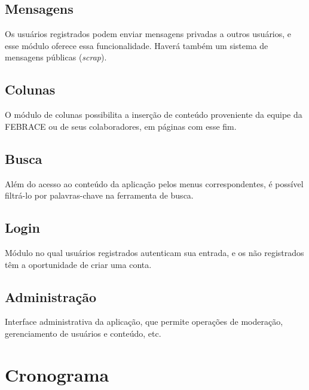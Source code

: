\documentclass[a4paper,12pt,font=plain,header=plain]{abnt}
\begin{document}
		\section{Mensagens}
		Os usuários registrados podem enviar mensagens privadas a outros usuários, e esse módulo oferece essa funcionalidade. Haverá também um sistema de mensagens públicas (\textit{scrap}).
	
		\section{Colunas}
		O módulo de colunas possibilita a inserção de conteúdo proveniente da equipe da FEBRACE ou de seus colaboradores, em páginas com esse fim.
		
		\section{Busca}
		Além do acesso ao conteúdo da aplicação pelos menus correspondentes, é possível filtrá-lo por palavras-chave na ferramenta de busca.
		
		\section{Login}
		Módulo no qual usuários registrados autenticam sua entrada, e os não registrados têm a oportunidade de criar uma conta.
	
		\section{Administração}
		Interface administrativa da aplicação, que permite operações de moderação, gerenciamento de usuários e conteúdo, etc.

  	\chapter{Cronograma}
\end{document}
